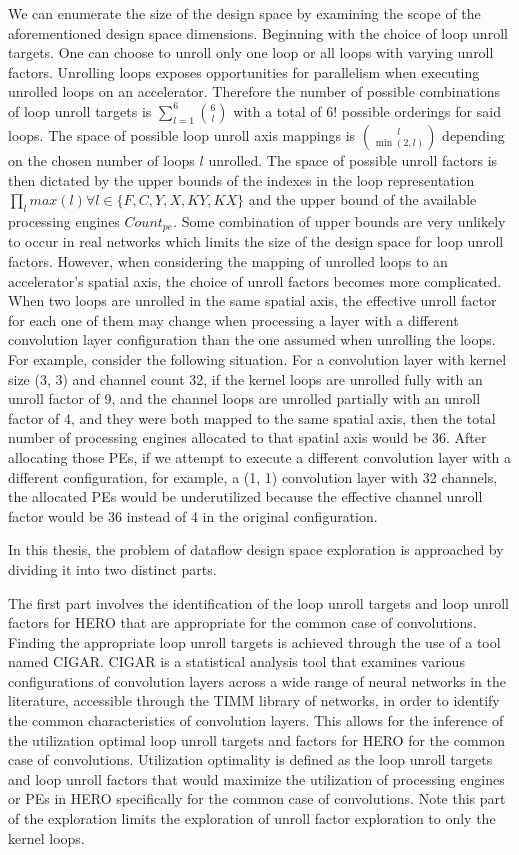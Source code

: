 We can enumerate the size of the design space by examining the scope
of the aforementioned design space dimensions. Beginning with the choice of loop
unroll targets. One can choose to unroll only one loop or all loops with
varying unroll factors. Unrolling loops exposes opportunities for parallelism
when executing unrolled loops on an accelerator. Therefore the number of
possible combinations of loop unroll targets is
$\sum\limits_{l=1}^{6}\binom{6}{l}$ with a total of $6!$ possible orderings for
said loops. The space of possible loop unroll axis mappings is $\binom{l}{\min(2,
l)}$ depending on the chosen number of loops $l$ unrolled. The space of possible
unroll factors is then dictated by the upper bounds of the indexes in the loop
representation $\prod_{l}  max(l) \forall l \in \{F,C,Y,X,KY,KX\} $ and the upper bound
of the available processing engines $Count_{pe}$. Some combination of upper
bounds are very unlikely to occur in real networks which limits the size of the
design space for loop unroll factors. However, when considering the
mapping of unrolled loops to an accelerator's spatial axis, the choice of unroll
factors becomes more complicated. When two loops are unrolled in the same
spatial axis, the effective unroll factor for each one of them may change when
processing a layer with a different convolution layer configuration than the one
assumed when unrolling the loops. For example, consider the following situation.
For a convolution layer with kernel size (3, 3) and channel count 32, if the kernel
loops are unrolled fully with an unroll factor of 9, and the channel loops are
unrolled partially with an unroll factor of 4, and they were both mapped to the
same spatial axis, then the total number of processing engines allocated to that
spatial axis would be 36. After allocating those PEs, if we attempt to execute a
different convolution layer with a different configuration, for example, a (1, 1)
convolution layer with 32 channels, the allocated PEs would be underutilized because
the effective channel unroll factor would be 36 instead of 4 in the original
configuration. 


In this thesis, the problem of dataflow design space exploration is approached
by dividing it into two distinct parts. 

The first part involves the
identification of the loop unroll targets and loop unroll factors for HERO that
are appropriate for the common case of convolutions. Finding the appropriate
loop unroll targets is achieved through the use of a tool named CIGAR. CIGAR is
a statistical analysis tool that examines various configurations of convolution
layers across a wide range of neural networks in the literature, accessible
through the TIMM library of networks, in order to identify the common
characteristics of convolution layers. This allows for the inference of the
utilization optimal loop unroll targets and factors for HERO for the common case of
convolutions. Utilization optimality is defined as the loop unroll targets and
loop unroll factors that would maximize the utilization of processing engines or
PEs in HERO specifically for the common case of convolutions.  
Note this part of the exploration limits the exploration of unroll factor
exploration to only the kernel loops. 

